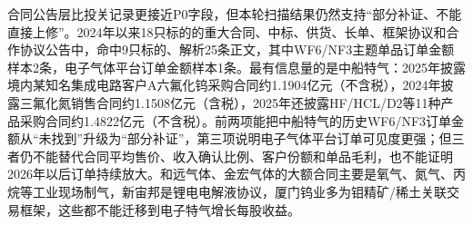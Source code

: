 合同公告层比投关记录更接近P0字段，但本轮扫描结果仍然支持“部分补证、不能直接上修”。2024年以来18只标的的重大合同、中标、供货、长单、框架协议和合作协议公告中，命中9只标的、解析25条正文，其中WF6/NF3主题单品订单金额样本2条，电子气体平台订单金额样本1条。最有信息量的是中船特气：2025年披露境内某知名集成电路客户A六氟化钨采购合同约1.1904亿元（不含税），2024年披露三氟化氮销售合同约1.1508亿元（含税），2025年还披露HF/HCL/D2等11种产品采购合同约1.4822亿元（不含税）。前两项能把中船特气的历史WF6/NF3订单金额从“未找到”升级为“部分补证”，第三项说明电子气体平台订单可见度更强；但三者仍不能替代合同平均售价、收入确认比例、客户份额和单品毛利，也不能证明2026年以后订单持续放大。和远气体、金宏气体的大额合同主要是氧气、氮气、丙烷等工业现场制气，新宙邦是锂电电解液协议，厦门钨业多为钼精矿/稀土关联交易框架，这些都不能迁移到电子特气增长每股收益。


